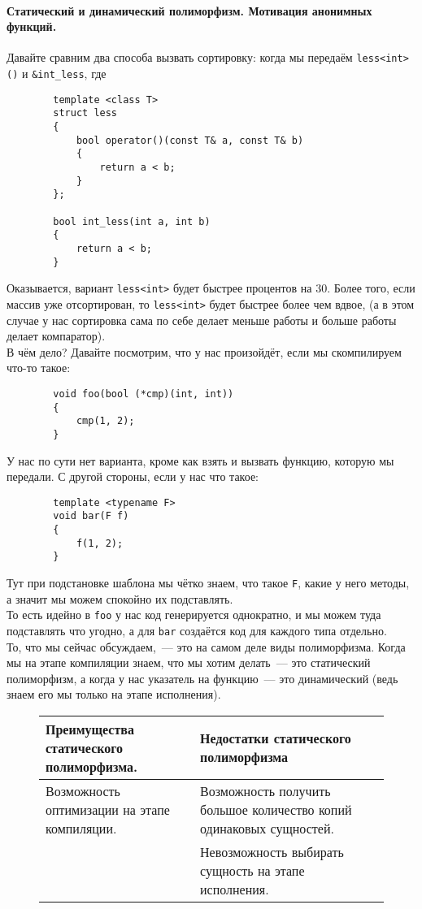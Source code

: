 \documentclass{article}
\begin{document}
    \paragraph{Статический и динамический полиморфизм. Мотивация анонимных функций.}
    Давайте сравним два способа вызвать сортировку: когда мы передаём \texttt{less<int>()} и \texttt{&int_less}, где
    \begin{verbatim}
        template <class T>
        struct less
        {
            bool operator()(const T& a, const T& b)
            {
                return a < b;
            }
        };

        bool int_less(int a, int b)
        {
            return a < b;
        }
    \end{verbatim}
    Оказывается, вариант \texttt{less<int>} будет быстрее процентов на 30. Более того, если массив уже отсортирован, то \texttt{less<int>} будет быстрее более чем вдвое, (а в этом случае у нас сортировка сама по себе делает меньше работы и больше работы делает компаратор).\\
    В чём дело? Давайте посмотрим, что у нас произойдёт, если мы скомпилируем что-то такое:
    \begin{verbatim}
        void foo(bool (*cmp)(int, int))
        {
            cmp(1, 2);
        }
    \end{verbatim}
    У нас по сути нет варианта, кроме как взять и вызвать функцию, которую мы передали. С другой стороны, если у нас что такое:
    \begin{verbatim}
        template <typename F>
        void bar(F f)
        {
            f(1, 2);
        }
    \end{verbatim}
    Тут при подстановке шаблона мы чётко знаем, что такое \texttt{F}, какие у него методы, а значит мы можем спокойно их подставлять.\\
    То есть идейно в \texttt{foo} у нас код генерируется однократно, и мы можем туда подставлять что угодно, а для \texttt{bar} создаётся код для каждого типа отдельно.\\
    То, что мы сейчас обсуждаем,~--- это на самом деле виды полиморфизма. Когда мы на этапе компиляции знаем, что мы хотим делать~--- это статический полиморфизм, а когда у нас указатель на функцию~--- это динамический (ведь знаем его мы только на этапе исполнения).
    \begin{figure}[H]
        \begin{tabular}{|m{}|m{}|}
            \hline
            Преимущества статического полиморфизма. & Недостатки статического полиморфизма\\
            \hline
            Возможность оптимизации на этапе компиляции. & Возможность получить большое количество копий одинаковых сущностей.\\
            \hline
            & Невозможность выбирать сущность на этапе исполнения.\\
            \hline
        \end{tabular}
    \end{figure}\noindent
\end{document}
